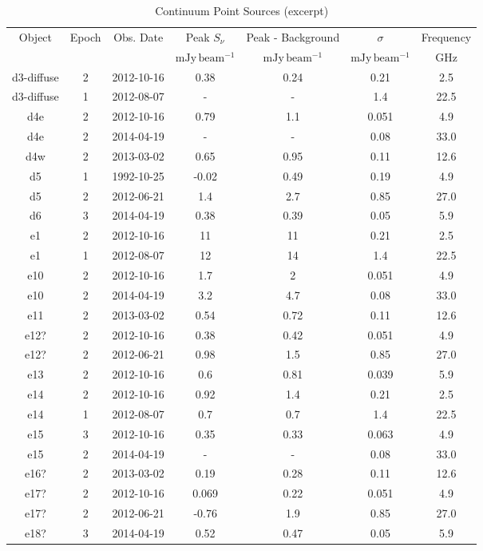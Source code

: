 \begin{table*}[htp]
\caption{Continuum Point Sources (excerpt)}
\begin{tabular}{ccccccc}
\label{tab:contsrcs}
Object & Epoch & Obs. Date & Peak $S_{\nu}$ & Peak - Background & $\sigma$ & Frequency \\
 &  &  & $\mathrm{mJy\,beam^{-1}}$ & $\mathrm{mJy\,beam^{-1}}$ & $\mathrm{mJy\,beam^{-1}}$ & $\mathrm{GHz}$ \\
\hline
d3-diffuse & 2 & 2012-10-16 & 0.38 & 0.24 & 0.21 & 2.5 \\
d3-diffuse & 1 & 2012-08-07 & - & - & 1.4 & 22.5 \\
d4e & 2 & 2012-10-16 & 0.79 & 1.1 & 0.051 & 4.9 \\
d4e & 2 & 2014-04-19 & - & - & 0.08 & 33.0 \\
d4w & 2 & 2013-03-02 & 0.65 & 0.95 & 0.11 & 12.6 \\
d5 & 1 & 1992-10-25 & -0.02 & 0.49 & 0.19 & 4.9 \\
d5 & 2 & 2012-06-21 & 1.4 & 2.7 & 0.85 & 27.0 \\
d6 & 3 & 2014-04-19 & 0.38 & 0.39 & 0.05 & 5.9 \\
e1 & 2 & 2012-10-16 & 11 & 11 & 0.21 & 2.5 \\
e1 & 1 & 2012-08-07 & 12 & 14 & 1.4 & 22.5 \\
e10 & 2 & 2012-10-16 & 1.7 & 2 & 0.051 & 4.9 \\
e10 & 2 & 2014-04-19 & 3.2 & 4.7 & 0.08 & 33.0 \\
e11 & 2 & 2013-03-02 & 0.54 & 0.72 & 0.11 & 12.6 \\
e12? & 2 & 2012-10-16 & 0.38 & 0.42 & 0.051 & 4.9 \\
e12? & 2 & 2012-06-21 & 0.98 & 1.5 & 0.85 & 27.0 \\
e13 & 2 & 2012-10-16 & 0.6 & 0.81 & 0.039 & 5.9 \\
e14 & 2 & 2012-10-16 & 0.92 & 1.4 & 0.21 & 2.5 \\
e14 & 1 & 2012-08-07 & 0.7 & 0.7 & 1.4 & 22.5 \\
e15 & 3 & 2012-10-16 & 0.35 & 0.33 & 0.063 & 4.9 \\
e15 & 2 & 2014-04-19 & - & - & 0.08 & 33.0 \\
e16? & 2 & 2013-03-02 & 0.19 & 0.28 & 0.11 & 12.6 \\
e17? & 2 & 2012-10-16 & 0.069 & 0.22 & 0.051 & 4.9 \\
e17? & 2 & 2012-06-21 & -0.76 & 1.9 & 0.85 & 27.0 \\
e18? & 3 & 2014-04-19 & 0.52 & 0.47 & 0.05 & 5.9 \\

\end{tabular}
\end{table*}
